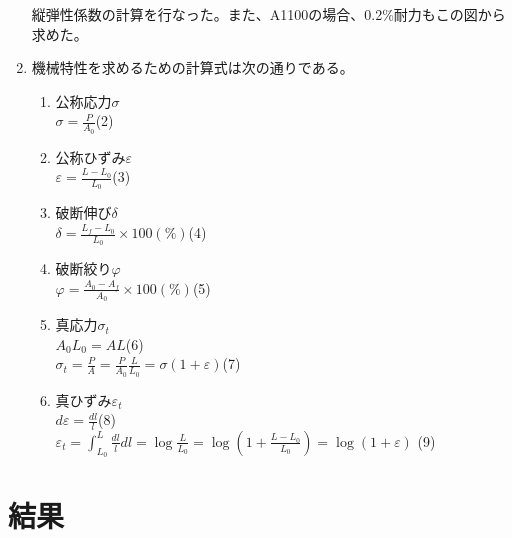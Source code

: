 \documentclass[10pt,a4j]{jsarticle}
\begin{document}
\begin{enumerate}
    縦弾性係数の計算を行なった。また、A1100の場合、0.2\%耐力もこの図から求めた。
    \item 機械特性を求めるための計算式は次の通りである。
      \begin{enumerate}
        \item 公称応力$σ$ \\
          $σ = \frac{P}{A_{0}}$\quad(2)
        \item 公称ひずみ$ε$ \\
          $ε = \frac{L-L_{0}}{L_{0}}$\quad(3)
        \item 破断伸び$δ$ \\
          $δ = \frac{L_{f} - L_{0}}{L_{0}} \times 100 (\%)$\quad(4)
        \item 破断絞り$φ$ \\
          $φ = \frac{A_{0} - A_{f}}{A_{0}} \times 100 (\%)$\quad(5)
        \item 真応力$σ_{t}$ \\
          $A_{0}L_{0} = AL$\quad(6) \\
          $σ_{t} = \frac{P}{A} = \frac{P}{A_{0}} \frac{L}{L_{0}} = σ(1+ε)$\quad(7) \\
        \item 真ひずみ$ε_{t}$ \\
          $dε = \frac{dl}{l}$\quad(8) \\
          $ε_{t} = \int_{L_{0}}^{L} \frac{dl}{l}dl = \log \frac{L}{L_{0}} = \log (1+\frac{L-L_{0}}{L_{0}}) = \log (1+ε)$ \quad(9)
      \end{enumerate}
  \end{enumerate}
\section{結果}
\end{document}
